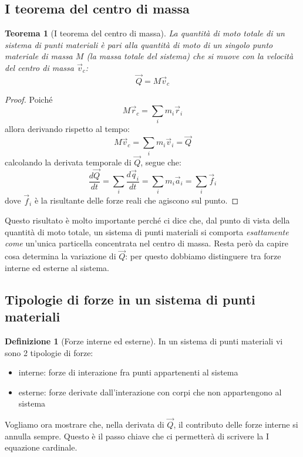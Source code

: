 \documentclass[11pt, a4paper, openright]{book}
\theoremstyle{plain}
\newtheorem{theorem}{Teorema}[section]
\theoremstyle{definition}
\newtheorem{definizione}{Definizione}[section]
\begin{document}
\subsection{I teorema del centro di massa}
\label{subsec:I-centro-massa}

\begin{theorem}[I teorema del centro di massa]
\label{thm:I-centro-massa}
La quantità di moto totale di un sistema di punti materiali è pari alla
quantità di moto di un singolo punto materiale di massa $M$ (la massa
totale del sistema) che si muove con la velocità del centro di massa
$\vec{v}_c$:
\[\vec{Q} = M\vec{v}_c\]
\end{theorem}

\begin{proof}
Poiché
\[M\vec{r}_c = \sum_i m_i \vec{r}_i\]
allora derivando rispetto al tempo:
\[M\vec{v}_c = \sum_i m_i\vec{v}_i = \vec{Q}\]
calcolando la derivata temporale di $\vec{Q}$, segue che:
\[\frac{d\vec{Q}}{dt} = \sum_i \frac{d\vec{q}_i}{dt} = \sum_i m_i\vec{a}_i = \sum_i \vec{f}_i\]
dove $\vec{f}_i$ è la risultante delle forze reali che agiscono sul punto.
\end{proof}

Questo risultato è molto importante perché ci dice che, dal punto di
vista della quantità di moto totale, un sistema di punti materiali si
comporta \emph{esattamente come} un'unica particella concentrata nel
centro di massa. Resta però da capire cosa determina la variazione di
$\vec{Q}$: per questo dobbiamo distinguere tra forze interne ed esterne
al sistema.

\subsection{Tipologie di forze in un sistema di punti materiali}
\label{subsec:tipologie-forze}

\begin{definizione}[Forze interne ed esterne]
\label{def:forze-interne-esterne}
In un sistema di punti materiali vi sono 2 tipologie di forze:
\begin{itemize}
    \item interne: forze di interazione fra punti appartenenti al sistema
    \item esterne: forze derivate dall'interazione con corpi che non appartengono al sistema
\end{itemize}
\end{definizione}

Vogliamo ora mostrare che, nella derivata di $\vec{Q}$, il contributo
delle forze interne si annulla sempre. Questo è il passo chiave che ci
permetterà di scrivere la I equazione cardinale.
\end{document}
